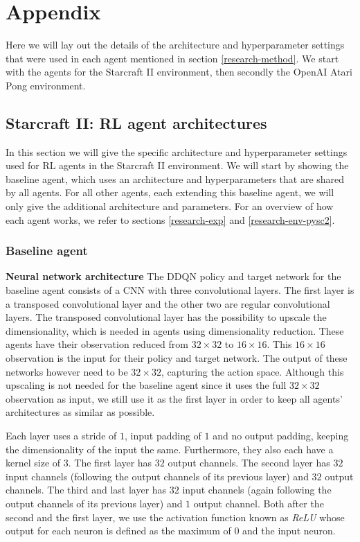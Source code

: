 \chapter{Appendix}\label{appendix}
Here we will lay out the details of the architecture and hyperparameter settings that were used in each agent mentioned in section \ref{research-method}. We start with the agents for the Starcraft II environment, then secondly the OpenAI Atari Pong environment.

\section{Starcraft II: RL agent architectures}\label{appendix-agents}
In this section we will give the specific architecture and hyperparameter settings used for RL agents in the Starcraft II environment. We will start by showing the baseline agent, which uses an architecture and hyperparameters that are shared by all agents. For all other agents, each extending this baseline agent, we will only give the additional architecture and parameters. For an overview of how each agent works, we refer to sections \ref{research-exp} and \ref{research-env-pysc2}.


\subsection{Baseline agent}\label{appendix-baseline}
\textbf{Neural network architecture}\newline
\noindent The DDQN policy and target network for the baseline agent consists of a CNN with three convolutional layers. The first layer is a transposed convolutional layer \cite{transpose} and the other two are regular convolutional layers. The transposed convolutional layer has the possibility to upscale the dimensionality, which is needed in agents using dimensionality reduction. These agents have their observation reduced from $32 \times 32$ to $16 \times 16$. This $16 \times 16$ observation is the input for their policy and target network. The output of these networks however need to be $32 \times 32$, capturing the action space. Although this upscaling is not needed for the baseline agent since it uses the full $32 \times 32$ observation as input, we still use it as the first layer in order to keep all agents' architectures as similar as possible.

Each layer uses a stride of $1$, input padding of $1$ and no output padding, keeping the dimensionality of the input the same. Furthermore, they also each have a kernel size of $3$. The first layer has $32$ output channels. The second layer has $32$ input channels (following the output channels of its previous layer) and $32$ output channels. The third and last layer has $32$ input channels (again following the output channels of its previous layer) and $1$ output channel. Both after the second and the first layer, we use the activation function known as \emph{ReLU} \cite{relu} whose output for each neuron is defined as the maximum of $0$ and the input neuron.

